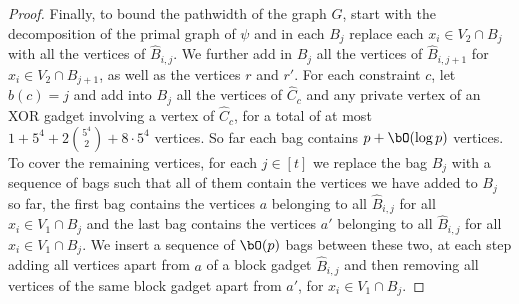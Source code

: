 \begin{proof}
        Finally, to bound the pathwidth of the graph $G$,
        start with the decomposition of the primal graph of $\psi$ and
        in each $B_j$ replace each $x_i \in V_2 \cap B_j$ with all the vertices of $\hat{B}_{i,j}$.
        We further add in $B_j$ all the vertices of $\hat{B}_{i,j+1}$ for $x_i \in V_2 \cap B_{j+1}$,
        as well as the vertices $r$ and $r'$.
        For each constraint $c$, let $b(c)=j$ and add into $B_j$ all the
        vertices of $\hat{C}_c$ and any private vertex of an XOR gadget involving a vertex of $\hat{C}_c$,
        for a total of at most $1 + 5^4 + 2\binom{5^4}{2} + 8 \cdot 5^4$ vertices.
        So far each bag contains $p + \bO(\log p)$ vertices.
        To cover the remaining vertices,
        for each $j \in [t]$ we replace the bag $B_j$ with a sequence of bags such that
        all of them contain the vertices we have added to $B_j$ so far,
        the first bag contains the vertices $a$ belonging to all $\hat{B}_{i,j}$ for all $x_i \in V_1 \cap B_j$ and
        the last bag contains the vertices $a'$ belonging to all $\hat{B}_{i,j}$ for all $x_i \in V_1 \cap B_j$.
        We insert a sequence of $\bO(p)$ bags between these two,
        at each step adding all vertices apart from $a$ of a block gadget $\hat{B}_{i,j}$ and then removing
        all vertices of the same block gadget apart from $a'$, for $x_i \in V_1 \cap B_j$.
\end{proof}
